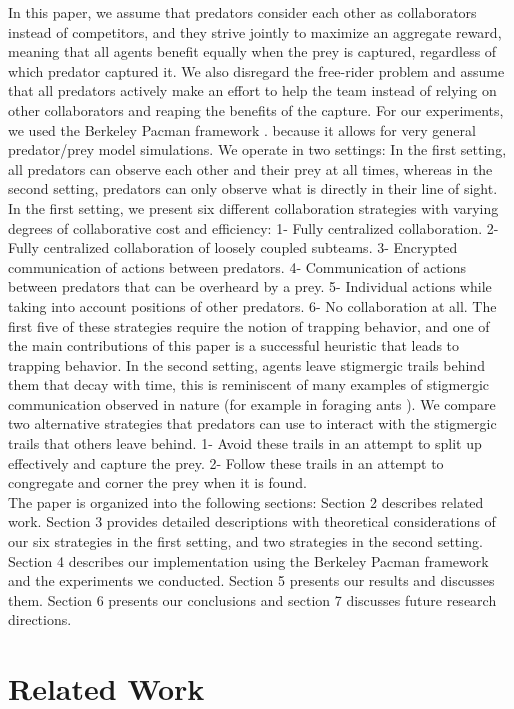 \documentclass[11pt]{article}
\begin{document}
\begin{multicols}{2}
In this paper, we assume that predators consider each other as collaborators instead of competitors, and they strive jointly to maximize an aggregate reward, meaning that all agents benefit equally when the prey is captured, regardless of which predator captured it. We also disregard the free-rider problem and assume that all predators actively make an effort to help the team instead of relying on other collaborators and reaping the benefits of the capture. For our experiments, we used the Berkeley Pacman framework \cite{Pacman}. because it allows for very general predator/prey model simulations. We operate in two settings: In the first setting, all predators can observe each other and their prey at all times, whereas in the second setting, predators can only observe what is directly in their line of sight. In the first setting, we present six different collaboration strategies with varying degrees of collaborative cost and efficiency: 1- Fully centralized collaboration. 2- Fully centralized collaboration of loosely coupled subteams. 3- Encrypted communication of actions between predators. 4- Communication of actions between predators that can be overheard by a prey. 5- Individual actions while taking into account positions of other predators. 6- No collaboration at all. The first five of these strategies require the notion of trapping behavior, and one of the main contributions of this paper is a successful heuristic that leads to trapping behavior. In the second setting, agents leave stigmergic trails behind them that decay with time, this is reminiscent of many examples of stigmergic communication observed in nature (for example in foraging ants \cite{beckers1992trails}). We compare two alternative strategies that predators can use to interact with the stigmergic trails that others leave behind. 1- Avoid these trails in an attempt to split up effectively and capture the prey. 2- Follow these trails in an attempt to congregate and corner the prey when it is found.\\
\indent The paper is organized into the following sections: Section 2 describes related work. Section 3 provides detailed descriptions with theoretical considerations of our six strategies in the first setting, and two strategies in the second setting. Section 4 describes our implementation using the Berkeley Pacman framework and the experiments we conducted. Section 5 presents our results and discusses them. Section 6 presents our conclusions and section 7 discusses future research directions. 

\section{Related Work}


\end{multicols}
\end{document}
